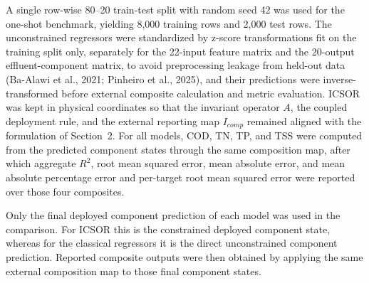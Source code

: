 \documentclass[a4paper,fleqn]{cas-sc}
\newenvironment{revblock}{\begingroup\color{revDefault}}{\endgroup}
\newenvironment{revblockr25}{\begingroup\color{revRtwoFive}}{\endgroup}
\begin{document}
\begin{revblock}
\begin{revblockr25}
A single row-wise 80--20 train-test split with random seed 42 was used for the one-shot benchmark, yielding 8,000 training rows and 2,000 test rows. The unconstrained regressors were standardized by z-score transformations fit on the training split only, separately for the 22-input feature matrix and the 20-output effluent-component matrix, to avoid preprocessing leakage from held-out data (Ba-Alawi et al., 2021; Pinheiro et al., 2025), and their predictions were inverse-transformed before external composite calculation and metric evaluation. ICSOR was kept in physical coordinates so that the invariant operator $A$, the coupled deployment rule, and the external reporting map $I_{comp}$ remained aligned with the formulation of Section~2. For all models, COD, TN, TP, and TSS were computed from the predicted component states through the same composition map, after which aggregate $R^2$, root mean squared error, mean absolute error, and mean absolute percentage error and per-target root mean squared error were reported over those four composites.

Only the final deployed component prediction of each model was used in the comparison. For ICSOR this is the constrained deployed component state, whereas for the classical regressors it is the direct unconstrained component prediction. Reported composite outputs were then obtained by applying the same external composition map to those final component states.


\end{revblockr25}
\end{revblock}
\end{document}
